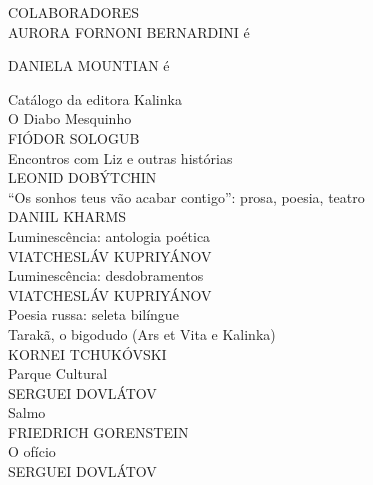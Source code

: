 \newpage
\pagestyle{empty}
\MyriadPro

\noindent{}COLABORADORES\\

\noindent{}AURORA FORNONI BERNARDINI é \lipsum[2]

\medskip

\noindent{}DANIELA MOUNTIAN é \lipsum[1]

\afterpage{\blankpage}

\newpage
\pagestyle{empty}
\MyriadPro

\noindent{}Catálogo da editora Kalinka\\[5pt]

\noindent{}O Diabo Mesquinho\\
FIÓDOR SOLOGUB\\

\noindent{}Encontros com Liz e outras histórias\\
LEONID DOBÝTCHIN\\

\noindent{}``Os sonhos teus vão acabar contigo'': prosa, poesia, teatro\\
DANIIL KHARMS\\

\noindent{}Luminescência: antologia poética\\
VIATCHESLÁV KUPRIYÁNOV\\

\noindent{}Luminescência: desdobramentos\\
VIATCHESLÁV KUPRIYÁNOV\\

\noindent{}Poesia russa: seleta bilíngue\\

\noindent{}Tarakã, o bigodudo (Ars et Vita e Kalinka)\\
KORNEI TCHUKÓVSKI\\

\noindent{}Parque Cultural\\
SERGUEI DOVLÁTOV\\

\noindent{}Salmo\\
FRIEDRICH GORENSTEIN\\

\noindent{}O ofício\\
SERGUEI DOVLÁTOV\\

